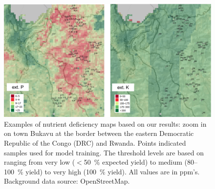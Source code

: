 \begin{linenumbers}
\begin{figure}[!hbt]
\includegraphics[width=\textwidth]{Fig_AfNutrients_defficiency_Rwanda.png}
\caption{Examples of nutrient deficiency maps based on our results: zoom in on town Bukavu at the border between the eastern Democratic Republic of the Congo (DRC) and Rwanda. Points indicated samples used for model training. The threshold levels are based on \citet[p.78]{roy2006plant} ranging from very low ($<$\SI{50}{\percent} expected yield) to medium (80--\SI{100}{\percent} yield) to very high (\SI{100}{\percent} yield). All values are in ppm's. Background data source: OpenStreetMap.}
\label{fig:defficiency}
\end{figure}


\end{linenumbers}
